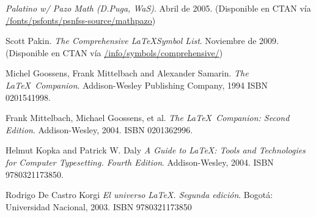 \documentclass[11pt,
              article,
              oneside
              ]{memoir}
\newcommand\CTANurl[1]{\url{#1}}
\begin{document}
\begin{thebibliography}{GMS94A}
  \newblock \emph{Palatino w/ Pazo Math (D.Puga, WaS)}.
  \newblock Abril de 2005.
  \newblock (Disponible en CTAN vía
             \CTANurl{/fonts/psfonts/psnfss-source/mathpazo})

	Scott Pakin.
  \newblock \emph{The Comprehensive \LaTeX Symbol List}.
  \newblock Noviembre de 2009.
  \newblock (Disponible en CTAN vía
             \CTANurl{/info/symbols/comprehensive/})

  Michel Goossens, Frank Mittelbach and Alexander Samarin.
  \newblock \emph{The \LaTeX\ Companion}.
  \newblock Addison-Wesley Publishing Company, 1994
  \newblock ISBN 0201541998.

  Frank Mittelbach, Michael Goossens, et al.
  \newblock \emph{The \LaTeX\ Companion: Second Edition}.
  \newblock Addison-Wesley, 2004.
  \newblock ISBN 0201362996.

  Helmut Kopka and Patrick W. Daly
  \newblock \emph{A Guide to \LaTeX: Tools and Technologies for Computer Typesetting. Fourth Edition}.
  \newblock Addison-Wesley, 2004.
  \newblock ISBN 9780321173850.

  Rodrigo De Castro Korgi
  \newblock \emph{El universo \LaTeX. Segunda edición}.
  \newblock Bogotá: Universidad Nacional, 2003.
  \newblock ISBN 9780321173850

\end{thebibliography}
\end{document}
